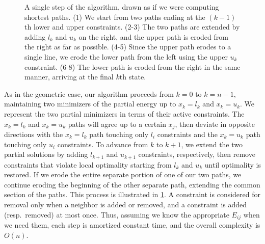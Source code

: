 \documentclass[11pt]{article}
\begin{document}
\begin{figure}
\begin{center}
\end{center}
\caption{A single step of the algorithm, drawn as if we were computing shortest paths.
(1) We start from two paths ending at the $(k-1)$th lower and upper constraints.
(2-3) The two paths are extended by adding $l_k$ and $u_k$ on the right, and the upper path is eroded from the right as far as possible.
(4-5) Since the upper path erodes to a single line, we erode the lower path from the left using the upper $u_k$ constraint.
(6-8) The lower path is eroded from the right in the same manner, arriving at the final $k$th state.
\label{erode}}
\end{figure}

As in the geometric case, our algorithm proceeds from $k = 0$ to $k = n-1$, maintaining two minimizers of the partial energy up to $x_k = l_k$ and $x_k = u_k$.  We represent the two partial minimizers in terms of
their active constraints.  The $x_k = l_k$ and $x_k = u_k$ paths will agree up to a certain $x_j$, then deviate
in opposite directions with the $x_k = l_k$ path touching only $l_i$ constraints and the $x_k = u_k$ path touching only $u_i$ constraints.  To advance from $k$ to $k+1$, we extend the two partial solutions by adding
$l_{k+1}$ and $u_{k+1}$ constraints, respectively, then remove constraints that violate local optimality starting from $l_k$ and $u_k$ until optimality is restored.  If we erode the entire separate
portion of one of our two paths, we continue eroding the beginning of the other separate path, extending the common section of the paths.  This process is illustrated in \cref{erode}.
A constraint is considered for removal only when a neighbor is added or removed, and a constraint is added (resp.\ removed) at most once.  Thus, assuming we know the appropriate $E_{ij}$ when we need them, each step
is amortized constant time, and the overall complexity is $O(n)$.
\end{document}
